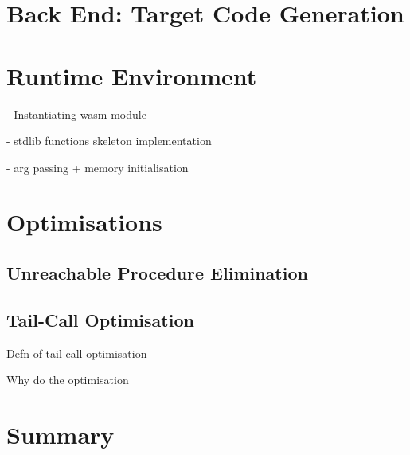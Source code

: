 \documentclass[00-main.tex]{subfiles}
\begin{document}
\section{Back End: Target Code Generation}


\section{Runtime Environment}

\begin{Comment}
- Instantiating wasm module

- stdlib functions skeleton implementation

- arg passing + memory initialisation
\end{Comment}

\section{Optimisations}

\subsection{Unreachable Procedure Elimination}

\subsection{Tail-Call Optimisation}

\begin{Comment}
Defn of tail-call optimisation

Why do the optimisation
\end{Comment}

\section{Summary}
\end{document}
